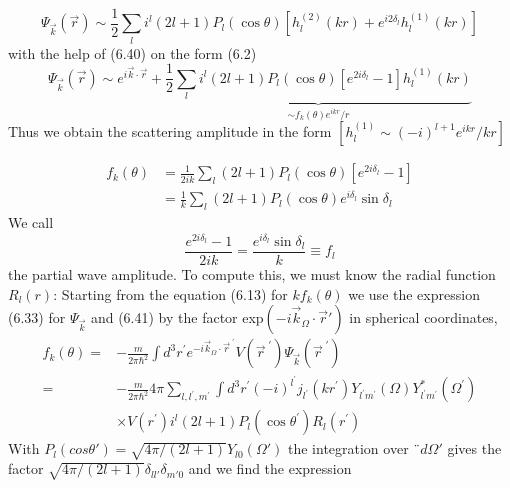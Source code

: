 \begin{equation}
    \Psi_{\vec{k}}(\vec{r}) \sim \frac{1}{2} \sum_{l} i^{l}(2 l+1) P_{l}(\cos \theta)\left[h_{l}^{(2)}(k r)+e^{i 2 \delta_{l}} h_{l}^{(1)}(k r)\right]
    \end{equation}
with the help of (6.40) on the form (6.2)
\begin{equation}
    \Psi_{\vec{k}}(\vec{r}) \sim e^{i \vec{k} \cdot \vec{r}}+\underbrace{\frac{1}{2} \sum_{l} i^{l}(2 l+1) P_{l}(\cos \theta)\left[e^{2 i \delta_{l}}-1\right] h_{l}^{(1)}(k r)}_{\sim f_{k}(\theta) e^{i k r} / r}
    \end{equation}
Thus we obtain the scattering amplitude in the form $[h_l^{(1)}\sim(-i)^{l+1}e^{ikr}/kr]$

\begin{equation}
\begin{aligned} f_{k}(\theta) &=\frac{1}{2 i k} \sum_{l}(2 l+1) P_{l}(\cos \theta)\left[e^{2 i \delta_{l}}-1\right] \\ &=\frac{1}{k} \sum_{l}(2 l+1) P_{l}(\cos \theta) e^{i \delta_{l}} \sin \delta_{l} \end{aligned}
\end{equation}
We call
\begin{equation}
    \frac{e^{2 i \delta_{l}}-1}{2 i k}=\frac{e^{i \delta_{l}} \sin \delta_{l}}{k} \equiv f_{l}
    \end{equation}
the partial wave amplitude. To compute this, we must know the radial function $R_l (r)$: Starting from the equation (6.13) for $kf_k (\theta)$ we use the expression (6.33) for $\Psi_{\vec{k}}$ and (6.41) by the factor exp$ (- i\vec{k}_{\Omega} \cdot\vec{r}')$ in spherical coordinates,
\begin{equation}
\begin{aligned} f_{k}(\theta)=&-\frac{m}{2 \pi \hbar^{2}} \int d^{3} r^{\prime} e^{-i \vec{k}_{\Omega} \cdot \vec{r}^{\;\prime}} V\left(\vec{r}^{\;\prime}\right) \Psi_{\vec{k}}\left(\vec{r}^{\;\prime}\right) \\=&-\frac{m}{2 \pi \hbar^{2}} 4 \pi \sum_{l, l^{\prime}, m^{\prime}} \int d^{3} r^{\prime}(-i)^{l^{\prime}} j_{l^{\prime}}\left(k r^{\prime}\right) Y_{l^{\prime} m^{\prime}}(\Omega) Y_{l^{\prime} m^{\prime}}^{*}\left(\Omega^{\prime}\right) \\ & \times V\left(r^{\prime}\right) i^{l}(2 l+1) P_{l}\left(\cos \theta^{\prime}\right) R_{l}\left(r^{\prime}\right) \end{aligned}
\end{equation}
With $P_l (cos \theta')=\sqrt{4\pi/(2l+1)}Y_{l0}(\Omega')$ the integration over $ ¨d\Omega'$ gives the factor $\sqrt{4\pi/(2l+1)}\delta_{ll'}\delta_{m'0}$ and we find the expression

